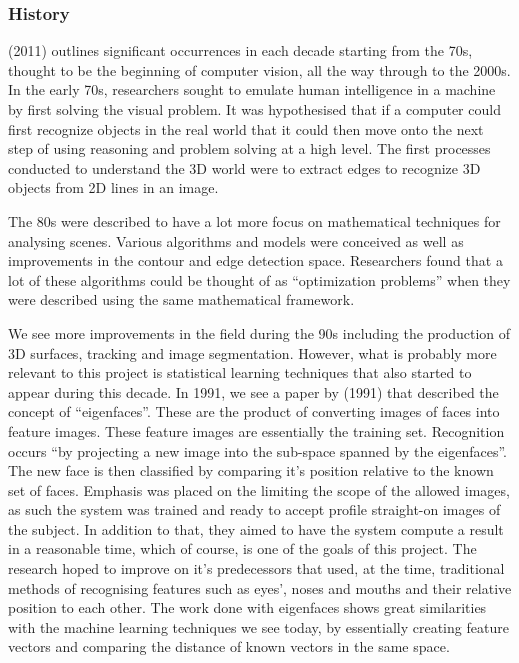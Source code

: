 \documentclass{article}
\begin{document}
\subsubsection{History}

\citeauthor{SzeliskiRichard2011CV:A} (2011) outlines significant occurrences in each decade starting from the 70s, 
thought to be the beginning of computer vision, all the way through to the 2000s. In the early 70s, researchers sought 
to emulate human intelligence in a machine by first solving the visual problem. It was hypothesised that if a computer 
could first recognize objects in the real world that it could then move onto the next step of using reasoning and 
problem solving at a high level. The first processes conducted to understand the 3D world were to extract edges to 
recognize 3D objects from 2D lines in an image.

\par

The 80s were described to have a lot more focus on mathematical techniques for analysing scenes. Various algorithms 
and models were conceived as well as improvements in the contour and edge detection space. Researchers found that a 
lot of these algorithms could be thought of as “optimization problems” when they were described using the same 
mathematical framework.

\par

We see more improvements in the field during the 90s including the production of 3D surfaces, tracking and image 
segmentation. However, what is probably more relevant to this project is statistical learning techniques that also 
started to appear during this decade. In 1991, we see a paper by \citeauthor{turk1991face} (1991) that described
the concept of “eigenfaces”. These are the product of converting images of faces into feature images. These feature 
images are essentially the training set. Recognition occurs “by projecting a new image into the sub-space spanned by 
the eigenfaces”. The new face is then classified by comparing it's position relative to the known set of faces. 
Emphasis was placed on the limiting the scope of the allowed images, as such the system was trained and ready to 
accept profile straight-on images of the subject. In addition to that, they aimed to have the system compute a result
in a reasonable time, which of course, is one of the goals of this project. The research hoped to improve on it's 
predecessors that used, at the time, traditional methods of recognising features such as eyes', noses and mouths and 
their relative position to each other. The work done with eigenfaces shows great similarities with the machine 
learning techniques we see today, by essentially creating feature vectors and comparing the distance of known 
vectors in the same space.
\end{document}
